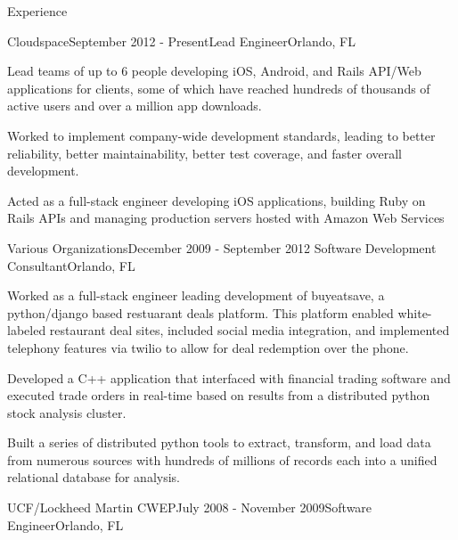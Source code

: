 \documentclass{resume} %
\begin{document}
\begin{rSection}{Experience}

\begin{rSubsection}{Cloudspace}{September 2012 - Present}{Lead Engineer}{Orlando, FL}

\item Lead teams of up to 6 people developing iOS, Android, and Rails API/Web applications for clients, some of which have reached hundreds of thousands of active users and over a million app downloads.
\item Worked to implement company-wide development standards, leading to better reliability, better maintainability, better test coverage, and faster overall development.
\item Acted as a full-stack engineer developing iOS applications, building Ruby on Rails APIs and managing production servers hosted with Amazon Web Services

\end{rSubsection}


\begin{rSubsection}{Various Organizations}{December 2009 - September 2012}{ Software Development Consultant}{Orlando, FL}

\item Worked as a full-stack engineer leading development of buyeatsave, a python/django based restuarant deals platform.  This platform enabled white-labeled restaurant deal sites, included social media integration, and implemented telephony features via twilio to allow for deal redemption over the phone.
\item Developed a C++ application that interfaced with financial trading software and executed trade orders in real-time based on results from a distributed python stock analysis cluster.
\item Built a series of distributed python tools to extract, transform, and load data from numerous sources with hundreds of millions of records each into a unified relational database for analysis.


\end{rSubsection}


\begin{rSubsection}{UCF/Lockheed Martin CWEP}{July 2008 - November 2009}{Software Engineer}{Orlando, FL}


\end{rSubsection}
\end{rSection}
\end{document}
